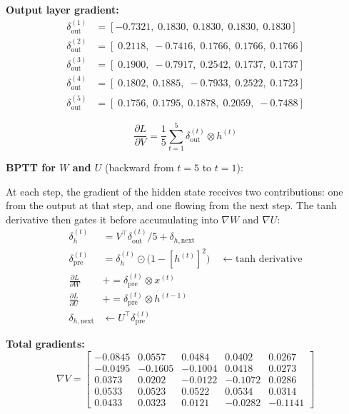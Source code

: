 \textbf{Output layer gradient:}
\begin{align*}
    \delta_{\text{out}}^{(1)} &= [-0.7321,\; 0.1830,\; 0.1830,\; 0.1830,\; 0.1830] \\
    \delta_{\text{out}}^{(2)} &= [\; 0.2118,\;-0.7416,\; 0.1766,\; 0.1766,\; 0.1766] \\
    \delta_{\text{out}}^{(3)} &= [\; 0.1900,\;-0.7917,\; 0.2542,\; 0.1737,\; 0.1737] \\
    \delta_{\text{out}}^{(4)} &= [\; 0.1802,\; 0.1885,\;-0.7933,\; 0.2522,\; 0.1723] \\
    \delta_{\text{out}}^{(5)} &= [\; 0.1756,\; 0.1795,\; 0.1878,\; 0.2059,\;-0.7488]
\end{align*}

\begin{equation}
    \frac{\partial L}{\partial V} = \frac{1}{5}\sum_{t=1}^{5} \delta_{\text{out}}^{(t)} \otimes h^{(t)}
\end{equation}

\textbf{BPTT for $W$ and $U$} (backward from $t=5$ to $t=1$):

At each step, the gradient of the hidden state receives two contributions: one from the
output at that step, and one flowing from the next step. The tanh derivative then
gates it before accumulating into $\nabla W$ and $\nabla U$:
\begin{align*}
    \delta_h^{(t)} &= V^\top \delta_{\text{out}}^{(t)}/5 + \delta_{h,\text{next}} \\
    \delta_{\text{pre}}^{(t)} &= \delta_h^{(t)} \odot \bigl(1 - [h^{(t)}]^2\bigr) \quad
        \leftarrow \text{tanh derivative} \\
    \frac{\partial L}{\partial W} &\mathrel{+}= \delta_{\text{pre}}^{(t)} \otimes x^{(t)} \\
    \frac{\partial L}{\partial U} &\mathrel{+}= \delta_{\text{pre}}^{(t)} \otimes h^{(t-1)} \\
    \delta_{h,\text{next}} &\leftarrow U^\top \delta_{\text{pre}}^{(t)}
\end{align*}

\textbf{Total gradients:}
\begin{equation}
    \nabla V = \begin{bmatrix}
    -0.0845 &  0.0557 &  0.0484 &  0.0402 &  0.0267 \\
    -0.0495 & -0.1605 & -0.1004 &  0.0418 &  0.0273 \\
     0.0373 &  0.0202 & -0.0122 & -0.1072 &  0.0286 \\
     0.0533 &  0.0523 &  0.0522 &  0.0534 &  0.0314 \\
     0.0433 &  0.0323 &  0.0121 & -0.0282 & -0.1141
    \end{bmatrix}
\end{equation}

